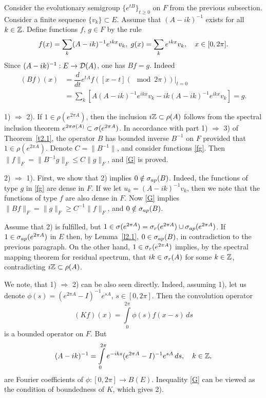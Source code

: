 \begin{pf}
Consider the evolutionary semigroup
$\{e^{tB}\}_{t\geq 0}$ on $F$ from the previous subsection.  Consider a finite
sequence $\{v_k\}\subset E$. Assume that $(A-ik)^{-1}$ exists for all
$k\in {\Bbb{Z}}$. Define
functions $f$, $g\in F$ by the rule
\begin{equation}
f(x) =\sum_k (A-ik)^{-1} e^{ikx} v_k, \; g(x) =\sum_k e^{ikx} v_k,\quad
x\in [0,2\pi].
\lb{fg}
\end{equation}
Since $(A-ik)^{-1}: E\to {\cal{D}} (A)$, one has $Bf=g$.  Indeed
\begin{align*}
(Bf)(x) &= \dfrac{d}{dt} e^{tA} f([x-t] (\mod 2\pi))\big|_{t=0}\\
& =\sum_k [A (A-ik)^{-1} e^{ikx} v_k -ik (A-ik)^{-1} e^{ikx}v_k]=g.
\end{align*}

1) $\Rightarrow$ 2).  If $1\in \rho (e^{2\pi A})$, then the
inclusion $i{\Bbb{Z}} \subset\rho (A)$
follows from the spectral inclusion theorem $e^{2\pi \sigma(A)}\subset
\sigma (e^{2\pi A})$.
In accordance
with part 1) $\Rightarrow$ 3) of Theorem~\ref{t2.1},
the operator $B$ has bounded
inverse $B^{-1}$ on $F$ provided that
$1\in \rho (e^{2\pi A})$.  Denote $C=\|B^{-1}\|$, and consider
functions \eqref{fg}.  Then $\|f\|_F=\|B^{-1}g\|_F \leq C\|g\|_F$,
and \eqref{G} is proved.

2) $\Rightarrow$ 1).  First, we show that 2) implies $0\notin \sigma_{ap} (B)$.
Indeed, the
functions of type $g$ in \eqref{fg} are dense in $F$.
If we let $u_k =(A-ik)^{-1} v_k$, then we note that the functions
of type $f$ are also dense in $F$. Now \eqref{G} implies
$\|Bf\|_F =\|g\|_F \geq C^{-1} \|f\|_F$, and $0 \notin
\sigma_{ap}(B)$.

Assume that 2) is fulfilled, but $1\in \sigma (e^{2\pi A})=\sigma_r (e^{2\pi A})
\cup \sigma_{ap} (e^{2\pi A})$.  If $1\in \sigma_{ap}(e^{2\pi A})$ in $E$
then, by Lemma~\ref{l2.1}, $0\in \sigma_{ap}(B)$, in contradiction to the
previous paragraph.  On the other hand,
$1\in \sigma_r (e^{2\pi A})$ implies, by the
spectral mapping theorem for residual spectrum, that $ik \in \sigma_r (A)$
for some $k\in{\Bbb{Z}}$, contradicting
$i{\Bbb{Z}} \subset \rho (A)$.
\end{pf}
 We note, that 1) $\Rightarrow$ 2) can be also
seen directly. Indeed, assuming 1), let us denote
$\phi (s)=(e^{2\pi
A}-I)^{-1}e^{sA}$, $s\in [0,2\pi]$. Then the convolution operator
\begin{equation*} (Kf)(x)=\int\limits_0^{2\pi}\phi(s)f(x-s)\,ds
\end{equation*}
is a bounded operator on $F$.
But
\begin{equation*}
(A-ik)^{-1}=\int\limits_0^{2\pi}e^{-iks}(e^{2\pi A}-I)^{-1}e^{sA}\,
ds,\quad k\in\Bbb Z,
\end{equation*}
are Fourier coefficients of $\phi:[0,2\pi]\to B(E)$. Inequality
\eqref{G} can be viewed as the condition of boundedness of $K$,
which gives 2).
\medskip


